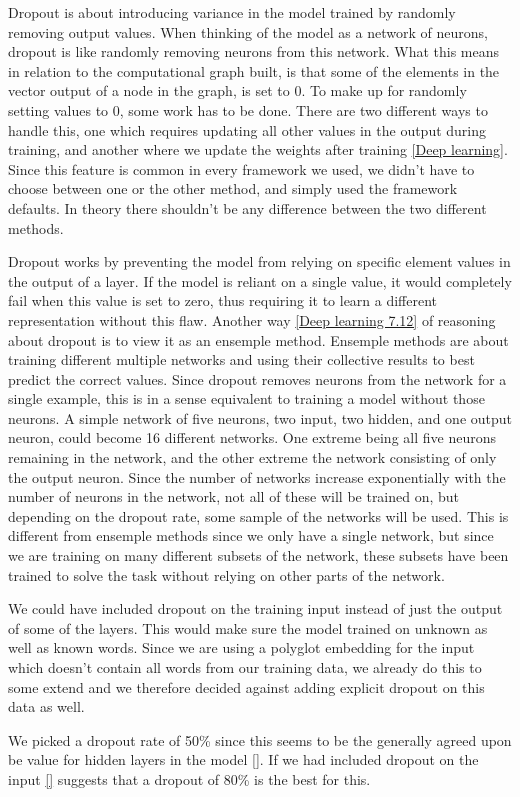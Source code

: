 Dropout is about introducing variance in the model trained by randomly removing
output values. When thinking of the model as a network of neurons, dropout is
like randomly removing neurons from this network. What this means in relation to
the computational graph built, is that some of the elements in the vector output
of a node in the graph, is set to 0. To make up for randomly setting values to
0, some work has to be done. There are two different ways to handle this, one
which requires updating all other values in the output during training, and
another where we update the weights after training \ref{Deep learning}. Since
this feature is common in every framework we used, we didn't have to choose
between one or the other method, and simply used the framework defaults. In
theory there shouldn't be any difference between the two different methods.

Dropout works by preventing the model from relying on specific element values in
the output of a layer. If the model is reliant on a single value, it would
completely fail when this value is set to zero, thus requiring it to learn a
different representation without this flaw. Another way \ref{Deep learning 7.12}
of reasoning about dropout is to view it as an ensemple method. Ensemple methods
are about training different multiple networks and using their collective
results to best predict the correct values. Since dropout removes neurons from
the network for a single example, this is in a sense equivalent to training a
model without those neurons. A simple network of five neurons, two input, two
hidden, and one output neuron, could become 16 different networks. One extreme
being all five neurons remaining in the network, and the other extreme the
network consisting of only the output neuron. Since the number of networks
increase exponentially with the number of neurons in the network, not all of
these will be trained on, but depending on the dropout rate, some sample of the
networks will be used. This is different from ensemple methods since we only
have a single network, but since we are training on many different subsets of
the network, these subsets have been trained to solve the task without relying
on other parts of the network. 

We could have included dropout on the training input instead of just the output
of some of the layers. This would make sure the model trained on unknown as well
as known words. Since we are using a polyglot embedding for the input which
doesn't contain all words from our training data, we already do this to some
extend and we therefore decided against adding explicit dropout on this data as
well.

We picked a dropout rate of 50\% since this seems to be the generally agreed
upon be value for hidden layers in the model \ref{}. If we had included dropout
on the input \ref{} suggests that a dropout of 80\% is the best for this.








